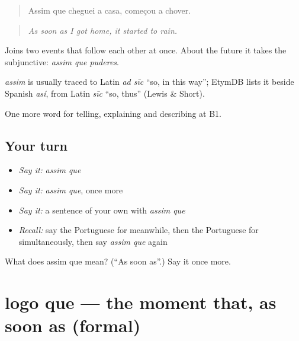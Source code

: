 \begin{quote}
Assim que cheguei a casa, começou a chover.
\end{quote}

\begin{quote}
\emph{As soon as I got home, it started to rain.}
\end{quote}

Joins two events that follow each other at once. About the future it takes the subjunctive: \emph{assim que puderes}.

\begin{cousinweb}
\emph{assim} is usually traced to Latin \emph{ad sīc} \textquotedblleft{}so, in this way\textquotedblright{}; EtymDB lists it beside Spanish \emph{así}, from Latin \emph{sīc} \textquotedblleft{}so, thus\textquotedblright{} (Lewis \& Short).
\end{cousinweb}

\begin{grammarlens}[title={What you've built}]
One more word for telling, explaining and describing at B1.
\end{grammarlens}

\subsection*{Your turn}
\begin{itemize}
\raggedright
  \item \emph{Say it:} \emph{assim que}
  \item \emph{Say it:} \emph{assim que}, once more
  \item \emph{Say it:} a sentence of your own with \emph{assim que}
  \item \emph{Recall:} say the Portuguese for meanwhile, then the Portuguese for simultaneously, then say \emph{assim que} again
\end{itemize}

\begin{tcolorbox}[breakable,colback=teal!4,colframe=teal!35!black,title={Before you move on}]
What does assim que mean? (\textquotedblleft{}As soon as\textquotedblright{}.) Say it once more.
\end{tcolorbox}
\section[logo que]{logo que — the moment that, as soon as (formal)}

\label{lesson:PT-C270-logo-que}



